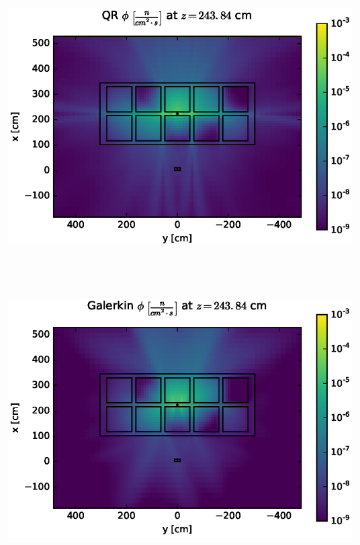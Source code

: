 \documentclass{article} %
\begin{document}
\clearpage
\begin{figure}[!htb]
\begin{subfigure}{\textwidth}
\centering
\includegraphics[max height=0.445\textheight]
{portal-fwd-flux-qr04.eps}
\end{subfigure}
\\
\begin{subfigure}{\textwidth}
\centering
\includegraphics[max height=0.445\textheight]
{portal-fwd-flux-gkn04.eps}
\end{subfigure}
\end{figure}
\clearpage
\end{document}
